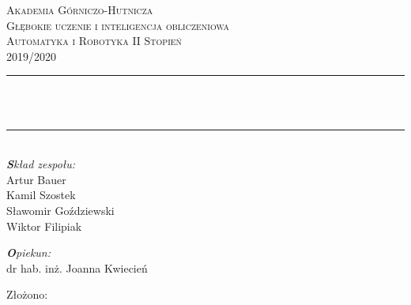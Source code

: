 
\begin{titlepage}
\makeatletter

  \newcommand{\HRule}{\rule{\linewidth}{0.5mm}} %

  \center %



  \textsc{\LARGE Akademia Górniczo-Hutnicza}\\[1.5cm] %
  \textsc{\Large  Głębokie uczenie i inteligencja obliczeniowa }\\[0.5cm] %
  \textsc{\large Automatyka i Robotyka II Stopień}\\[0.5cm] %
  \textsc{2019/2020}\\[0.5cm] %


  \vspace{1.5 cm}
  \HRule \\[0.4cm]
  { \huge \bfseries \@title} \\[0.4cm] %
  \HRule \\[1.5cm]
 

  {\em\Large\textbf Skład zespołu:}\\
  \vspace{.5 cm}
    Artur Bauer\\
    Kamil Szostek\\
    Sławomir Goździewski\\
    Wiktor Filipiak
  \vspace{1.5 cm}
  
  
  {\em\Large\textbf Opiekun:}\\
  \vspace{.5 cm}
  dr hab. inż. Joanna Kwiecień
  

  \vspace{1.5 cm}
  {\large Złożono: \@date}\\[3cm] %


\vfill %

\end{titlepage}


\newpage